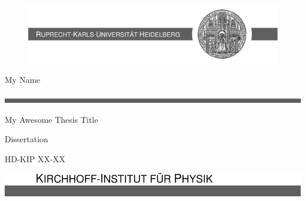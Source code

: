 \thispagestyle{empty}

\begin{figure}[t!]
	\centering
	\includegraphics[width=1\textwidth]{frontmatter/figures/Publ_Cover1.pdf}
\end{figure}

\vspace*{4cm}

\hspace*{-\parindent}%
\begin{minipage}[h]{0.75\textwidth}

	\begin{flushright}
		\LARGE{\textsf{My Name}}
	\end{flushright}

	\includegraphics[width=1\linewidth]{frontmatter/figures/Publ_Cover2.pdf}

	\vspace*{3mm}

	\begin{flushright}
		\huge{\textsf{
				My Awesome Thesis Title
		}}
	\end{flushright}

	\vspace*{3mm}

	\begin{flushright}
		\LARGE{\textsf{Dissertation}}
	\end{flushright}

	\vspace*{4mm}

	\begin{flushright}
		\LARGE{\textsf{HD-KIP XX-XX}}%
	\end{flushright}

\end{minipage}

\vfill

\hspace*{-\parindent}%
\begin{minipage}[b]{0.75\textwidth}
	\includegraphics[width=1\linewidth]{frontmatter/figures/Publ_Cover3.pdf}
\end{minipage}

\newpage~
\thispagestyle{empty}
